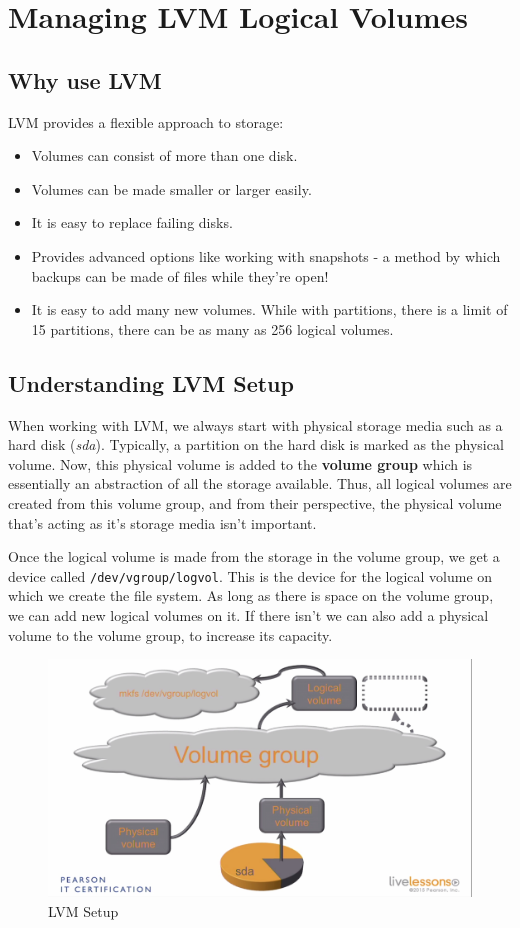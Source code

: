 \chapter{Managing LVM Logical Volumes}

\section{Why use LVM}
LVM provides a flexible approach to storage:

\vspace{-10pt}
\begin{itemize}
	\item Volumes can consist of more than one disk.
	\item Volumes can be made smaller or larger easily.
	\item It is easy to replace failing disks.
	\item Provides advanced options like working with snapshots - a method by which backups can be made of files while they're open!
	\item It is easy to add many new volumes. While with partitions, there is a limit of 15 partitions, there can be as many as 256 logical volumes. 
\end{itemize}

\section{Understanding LVM Setup}
When working with LVM, we always start with physical storage media such as a hard disk (\textit{sda}). Typically, a partition on the hard disk is marked as the physical volume. Now, this physical volume is added to the \textbf{volume group} which is essentially an abstraction of all the storage available. Thus, all logical volumes are created from this volume group, and from their perspective, the physical volume that's acting as it's storage media isn't important. 

Once the logical volume is made from the storage in the volume group, we get a device called \verb|/dev/vgroup/logvol|. This is the device for the logical volume on which we create the file system. As long as there is space on the volume group, we can add new logical volumes on it. If there isn't we can also add a physical volume to the volume group, to increase its capacity. 

\begin{figure}[H]
	\centering
	\includegraphics[width=0.9\linewidth]{Mod2/chapters/2.16.a}
	\caption{LVM Setup}
	\label{fig:2 LVM Setup}
\end{figure}

